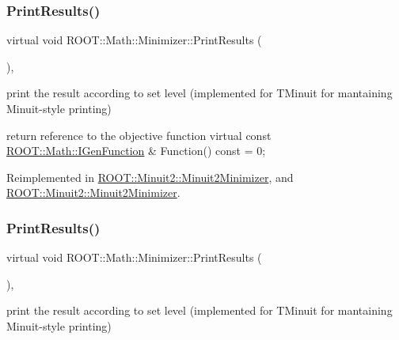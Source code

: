 \subsubsection{\texorpdfstring{PrintResults()}{PrintResults()}\hspace{0.1cm}{\footnotesize\ttfamily [1/2]}}
{\footnotesize\ttfamily virtual void R\+O\+O\+T\+::\+Math\+::\+Minimizer\+::\+Print\+Results (\begin{DoxyParamCaption}{ }\end{DoxyParamCaption})\hspace{0.3cm}{\ttfamily [inline]}, {\ttfamily [virtual]}}



print the result according to set level (implemented for T\+Minuit for mantaining Minuit-\/style printing) 

return reference to the objective function virtual const \mbox{\hyperlink{namespaceROOT_1_1Math_afe6400b4439b79d54c41fb9f5c5af171}{R\+O\+O\+T\+::\+Math\+::\+I\+Gen\+Function}} \& Function() const = 0; 

Reimplemented in \mbox{\hyperlink{classROOT_1_1Minuit2_1_1Minuit2Minimizer_a0caadc2005eac5d87fc7345bd54decf0}{R\+O\+O\+T\+::\+Minuit2\+::\+Minuit2\+Minimizer}}, and \mbox{\hyperlink{classROOT_1_1Minuit2_1_1Minuit2Minimizer_a0caadc2005eac5d87fc7345bd54decf0}{R\+O\+O\+T\+::\+Minuit2\+::\+Minuit2\+Minimizer}}.

\mbox{\label{classROOT_1_1Math_1_1Minimizer_aea1c5d69c6a1c1f2cf4d17a523862560}} 
\subsubsection{\texorpdfstring{PrintResults()}{PrintResults()}\hspace{0.1cm}{\footnotesize\ttfamily [2/2]}}
{\footnotesize\ttfamily virtual void R\+O\+O\+T\+::\+Math\+::\+Minimizer\+::\+Print\+Results (\begin{DoxyParamCaption}{ }\end{DoxyParamCaption})\hspace{0.3cm}{\ttfamily [inline]}, {\ttfamily [virtual]}}



print the result according to set level (implemented for T\+Minuit for mantaining Minuit-\/style printing) 

